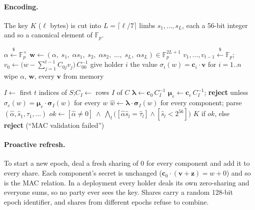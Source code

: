 \documentclass[11pt]{article}
\theoremstyle{remark}
\newcommand{\F}{\mathbb{F}_p}
\newcommand{\vect}[1]{\mathbf{#1}}
\begin{document}
\paragraph{Encoding.} The key $K$ ($\ell$ bytes) is cut into $L=\lceil \ell/7\rceil$
limbs $s_1,\dots,s_L$, each a 56-bit integer and so a canonical element of $\F$.

\begin{algorithm}[h]
\caption{\textsc{Deal}$(K, t, n)$}\label{alg:deal}
\begin{algorithmic}[1]
\State $\alpha \xleftarrow{\$} \F^{\times}$ 
\State $\vect w \gets (\alpha,\; s_1,\; \alpha s_1,\; s_2,\; \alpha s_2,\; \dots,\; s_L,\; \alpha s_L)\in\F^{2L+1}$
\For{each component $w$ of $\vect w$}
  \State $v_1,\dots,v_{t-1}\xleftarrow{\$}\F$;\quad
         $v_0 \gets \bigl(w - \sum_{j=1}^{t-1} C_{0j}v_j\bigr)\,C_{00}^{-1}$
         \Comment{so $\vect c_0\cdot\vect v = w$}
  \State give holder $i$ the value $\sigma_i(w) = \vect c_i\cdot\vect v$ \quad for $i=1..n$
\EndFor
\State wipe $\alpha$, $\vect w$, every $\vect v$ from memory
\end{algorithmic}
\end{algorithm}

\begin{algorithm}[h]
\caption{\textsc{Combine}$(\text{shares from index set } S,\ |S|\ge t)$}\label{alg:combine}
\begin{algorithmic}[1]
\State $I\gets$ first $t$ indices of $S$;\quad $C_I\gets$ rows $I$ of $C$
\State $\boldsymbol\lambda \gets \vect c_0\, C_I^{-1}$ 
 
  \State $\boldsymbol\mu_e \gets \vect c_e\, C_I^{-1}$; \textbf{reject} unless $\sigma_e(w) = \boldsymbol\mu_e\cdot\boldsymbol\sigma_I(w)$ for every $w$
\EndFor
\State $\hat w \gets \boldsymbol\lambda\cdot\boldsymbol\sigma_I(w)$ for every component; parse $(\hat\alpha,\hat s_1,\hat\tau_1,\dots)$
\State $ok \gets [\hat\alpha\neq 0]\ \wedge\ \bigwedge_{l}\bigl([\hat\alpha\hat s_l=\hat\tau_l]\wedge[\hat s_l<2^{56}]\bigr)$ 
\State \Return $K$ if $ok$, else \textbf{reject} (``MAC validation failed'')
\end{algorithmic}
\end{algorithm}

\paragraph{Proactive refresh.} To start a new epoch, deal a fresh sharing of $0$
for every component and add it to every share. Each component's secret is
unchanged ($\vect c_0\cdot(\vect v+\vect z)=w+0$) and so is the MAC relation. In a
deployment every holder deals its own zero-sharing and everyone sums, so no party
ever sees the key. Shares carry a random 128-bit epoch identifier, and shares from
different epochs refuse to combine.
\end{document}
